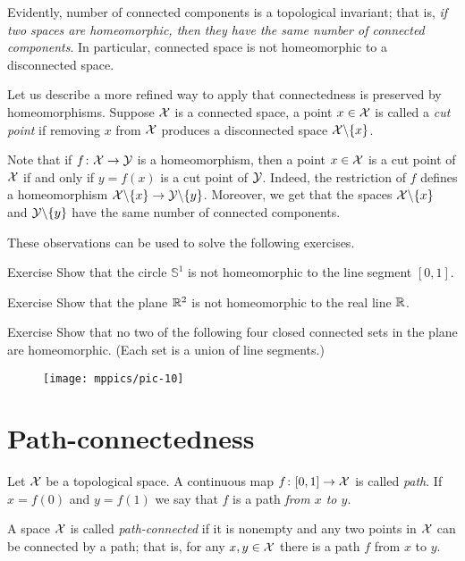 Evidently, number of connected components is a topological invariant;
that is, \textit{if two spaces are homeomorphic, then they have the same number of connected components}.
In particular, connected space is not homeomorphic to a disconnected space.

Let us describe a more refined way to apply that connectedness is preserved by
homeomorphisms.
Suppose $\mathcal{X}$ is a connected space, a point $x \in\mathcal{X}$ is called a \emph{cut point} if removing $x$ from $\mathcal{X}$ produces a disconnected space $\mathcal{X}\backslash\{x\}$.

Note that if $f\colon\mathcal{X}\to \mathcal{Y}$ is a homeomorphism, then a point $x \in\mathcal{X}$ is a cut point of $\mathcal{X}$ if and only if $y=f(x)$ is a cut point of $\mathcal{Y}$.
Indeed, the restriction of $f$ defines a homeomorphism $\mathcal{X}\backslash\{x\}\to \mathcal{Y}\backslash\{y\}$.
Moreover, we get that the spaces $\mathcal{X}\backslash\{x\}$ and $\mathcal{Y}\backslash\{y\}$ have the same number of connected components.

These observations can be used to solve the following exercises.

\begin{thm}{Exercise}
Show that the circle $\mathbb{S}^1$ is not homeomorphic to the line segment $[0,1]$.
\end{thm}

\begin{thm}{Exercise}
Show that the plane $\mathbb{R}^2$ is not homeomorphic to the real line $\mathbb{R}$.
\end{thm}

\begin{thm}{Exercise}
Show that no two of the following four closed connected sets in the plane are homeomorphic.
(Each set is a union of line segments.)

\begin{figure}[!ht]
\centering
\texttt{[image: mppics/pic-10]}
\end{figure}

\end{thm}


\section{Path-connectedness}

Let $\mathcal{X}$ be a topological space.
A continuous map $f\colon[0,1]\to \mathcal{X}$ is called \emph{path}.
If $x=f(0)$ and $y=f(1)$ we say that $f$ is a path \emph{from $x$ to $y$}.

A space $\mathcal{X}$ is called \emph{path-connected} if it is nonempty and any two points in $\mathcal{X}$ can be connected by a path;
that is, for any $x,y\in \mathcal{X}$ there is a path $f$ from $x$ to $y$.

